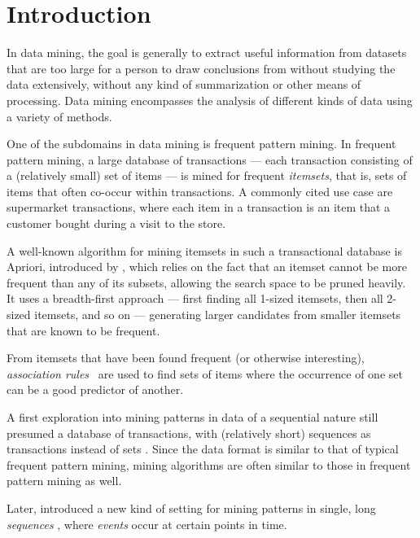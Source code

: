 \chapter{Introduction}

In data mining, the goal is generally to extract useful information from datasets that are too large for a person to draw conclusions from without studying the data extensively, without any kind of summarization or other means of processing. Data mining encompasses the analysis of different kinds of data using a variety of methods.

One of the subdomains in data mining is frequent pattern mining. In frequent pattern mining, a large database of transactions --- each transaction consisting of a (relatively small) set of items --- is mined for frequent \emph{itemsets}, that is, sets of items that often co-occur within transactions. A commonly cited use case are supermarket transactions, where each item in a transaction is an item that a customer bought during a visit to the store.

A well-known algorithm for mining itemsets in such a transactional database is Apriori, introduced by \citeauthor{agrawal1994fast} \citep{agrawal1994fast}, which relies on the fact that an itemset cannot be more frequent than any of its subsets, allowing the search space to be pruned heavily. It uses a breadth-first approach --- first finding all 1-sized itemsets, then all 2-sized itemsets, and so on --- generating larger candidates from smaller itemsets that are known to be frequent.

From itemsets that have been found frequent (or otherwise interesting), \emph{association rules}~\cite{agrawal1994fast} are used to find sets of items where the occurrence of one set can be a good predictor of another.

A first exploration into mining patterns in data of a sequential nature still presumed a database of transactions, with (relatively short) sequences as transactions instead of sets \citep{agrawal1995mining}.
Since the data format is similar to that of typical frequent pattern mining, mining algorithms are often similar to those in frequent pattern mining as well.

Later, \citeauthor{mannila1997discovery} introduced a new kind of setting for mining patterns in single, long \emph{sequences} \citep{mannila1997discovery}, where \emph{events} occur at certain points in time.


